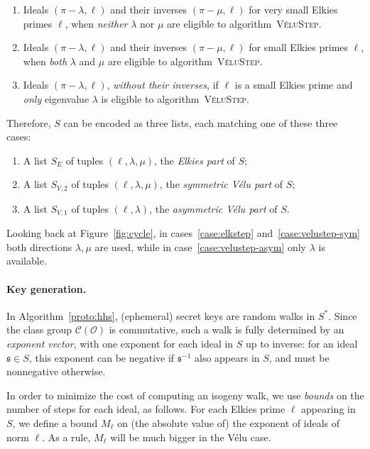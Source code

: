 \documentclass{llncs}
\newcommand{\Cl}{\mathcal{C}}
\renewcommand{\O}{\mathcal{O}}
\newcommand{\algstyle}[1]{\textsc{#1}}
\renewcommand{\frak}{\mathfrak}
\begin{document}
\begin{enumerate}
\item \label{case:elkstep} Ideals $(\pi - \lambda, \ell)$ and their inverses $(\pi - \mu, \ell)$
	for very small Elkies primes $\ell$, when \emph{neither} $\lambda$ nor $\mu$
	are eligible to algorithm~\algstyle{VéluStep}.
\item \label{case:velustep-sym} Ideals $(\pi - \lambda, \ell)$ and their inverses $(\pi - \mu, \ell)$
	for small Elkies primes $\ell$, when \emph{both} $\lambda$ and $\mu$
	are eligible to algorithm~\algstyle{VéluStep}.
\item \label{case:velustep-asym} Ideals $(\pi - \lambda, \ell)$, \emph{without their inverses},
	if $\ell$ is a small Elkies prime and \emph{only} eigenvalue $\lambda$
	is eligible to algorithm~\algstyle{VéluStep}.
\end{enumerate}

Therefore, $S$ can be encoded as three lists, each matching one of these three cases:

\begin{enumerate}
\item A list $S_E$ of tuples $(\ell, \lambda, \mu)$, the \emph{Elkies part} of $S$;
\item A list $S_{V, 2}$ of tuples $(\ell, \lambda, \mu)$, the \emph{symmetric Vélu part} of $S$;
\item A list $S_{V, 1}$ of tuples $(\ell, \lambda)$, the \emph{asymmetric Vélu part} of $S$.
\end{enumerate}

Looking back at Figure~\ref{fig:cycle}, in cases~\ref{case:elkstep} and~\ref{case:velustep-sym}
both directions $\lambda,\mu$ are used, while in case~\ref{case:velustep-asym} only $\lambda$ is
available.

\paragraph{Key generation.}

In Algorithm~\ref{proto:hhs}, (ephemeral) secret keys are random walks
in $S^*$. Since the class group $\Cl(\O)$ is commutative, such a walk is fully
determined by an \emph{exponent vector}, with one exponent for each ideal in $S$
up to inverse: for an ideal $\frak s\in S$, this exponent can be negative if
$\frak s^{-1}$ also appears in $S$, and must be nonnegative otherwise.

In order to minimize the cost of computing an isogeny walk, we use \emph{bounds}
on the number of steps for each ideal, as follows.
For each Elkies prime $\ell$ appearing in $S$, we define a bound $M_\ell$
on (the absolute value of) the exponent of ideals of norm $\ell$. As a rule,
$M_\ell$ will be much bigger in the Vélu case.
\end{document}
